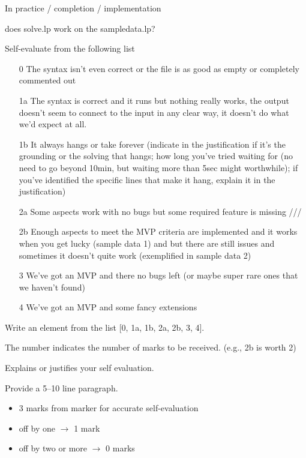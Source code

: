 \documentclass{article}
\begin{document}
\begin{Question}
In practice / completion / implementation

does solve.lp work on the sampledata.lp?

\begin{Subquestion}
Self-evaluate from the following list
\begin{itemize}
\item[0] The syntax isn't even correct or the file is as good as empty or completely commented out
\item[1a] The syntax is correct and it runs but nothing really works, the output doesn't seem to connect to the input in any clear way, it doesn't do what we'd expect at all.
\item[1b] It always hangs or take forever (indicate in the justification if it's the grounding or the solving that hangs; how long you've tried waiting for (no need to go beyond 10min, but waiting more than 5sec might worthwhile); if you've identified the specific lines that make it hang, explain it in the justification)
\item[2a] Some aspects work with no bugs but some required feature is missing ///
\item[2b] Enough aspects to meet the MVP criteria are implemented and it works when you get lucky (sample data 1) and but there are still issues and sometimes it doesn't quite work (exemplified in sample data 2)
\item[3] We've got an MVP and there no bugs left (or maybe super rare ones that we haven't found)
\item[4] We've got an MVP and some fancy extensions
\end{itemize}
\begin{answer}
Write an element from the list [0, 1a, 1b, 2a, 2b, 3, 4].
\end{answer}
\begin{markingguide}
The number indicates the number of marks to be received. (e.g., 2b is worth 2)
\end{markingguide}
\end{Subquestion}

\begin{Subquestion}
Explains or justifies your self evaluation.
\begin{answer}
Provide a 5--10 line paragraph.
\end{answer}
\begin{markingguide}
\begin{itemize}
\item 3 marks from marker for accurate self-evaluation
\item off by one $\rightarrow$ 1 mark
\item off by two or more $\rightarrow$ 0 marks
\end{itemize}


\end{markingguide}
\end{Subquestion}
\end{Question}
\end{document}
